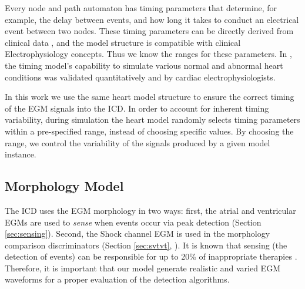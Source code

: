 Every node and path automaton has timing parameters that determine, for example, the delay between events, and how long it takes to conduct an electrical event between two nodes.
These timing parameters can be directly derived from clinical data \cite{josephson}, and the model structure is compatible with clinical Electrophysiology concepts.
Thus we know the ranges for these parameters.
In \cite{VHM_proc}, the timing model's capability to simulate various normal and abnormal heart conditions was validated quantitatively and by cardiac electrophysiologists.


In this work we use the same heart model structure to ensure the correct timing of the \ac{EGM} signals into the ICD.
In order to account for inherent timing variability, during simulation the heart model randomly selects timing parameters within a pre-specified range, instead of choosing specific values. 
By choosing the range, we control the variability of the signals produced by a given model instance.

\subsection{Morphology Model}
The ICD uses the \ac{EGM} morphology in two ways:
first, the atrial and ventricular EGMs are used to \emph{sense} when events occur via peak detection (Section \ref{sec:sensing}).
Second, the Shock channel EGM is used in the morphology comparison discriminators (Section \ref{sec:svtvt}, \cite{VTC,Wavelet}).
It is known that sensing (the detection of events) can be responsible for up to 20\% of inappropriate therapies \cite{wrong_sensing}.
Therefore, it is important that our model generate realistic and varied \ac{EGM} waveforms for a proper evaluation of the detection algorithms.

